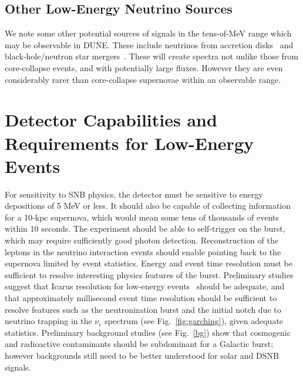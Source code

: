 \subsection{Other Low-Energy Neutrino Sources}

We note some other potential sources of signals in the tens-of-MeV range which may be observable in DUNE.  These include neutrinos from accretion disks~\cite{Caballero:2011dw} and black-hole/neutron star mergers~\cite{Caballero:2009ww}.  These will create spectra not unlike those from core-collapse events, and with potentially large fluxes.  However they are even considerably rarer than core-collapse supernovae within an observable range.


\section{Detector Capabilities and Requirements for Low-Energy Events}
\label{sec:physics-snblowe-detector-requirements}

For sensitivity to SNB physics, the detector must be sensitive to energy depositions of 5 MeV or less.  It should also be capable of collecting information for a 10-kpc supernova, which would mean some tens of thousands of events within 10 seconds.    The experiment should be able to self-trigger on the burst, which may require sufficiently good photon detection.  Reconstruction of the leptons in the neutrino interaction events should enable pointing back to the supernova limited by event statistics.
Energy and event time resolution must be sufficient to resolve interesting physics features of the burst.  Preliminary studies suggest that Icarus resolution for low-energy events~\cite{Amoruso:2003sw} should be adequate, and that approximately millisecond event time resolution should be sufficient to resolve features such as the neutronization burst and the initial notch due to neutrino trapping in the $\nu_e$ spectrum (see Fig.~\ref{fig:garching}), given adequate statistics.   Preliminary background studies (see Fig.~\ref{bg}) show that cosmogenic and radioactive contaminants should be subdominant for a Galactic burst; however backgrounds still need to be better understood for solar and DSNB signals.



